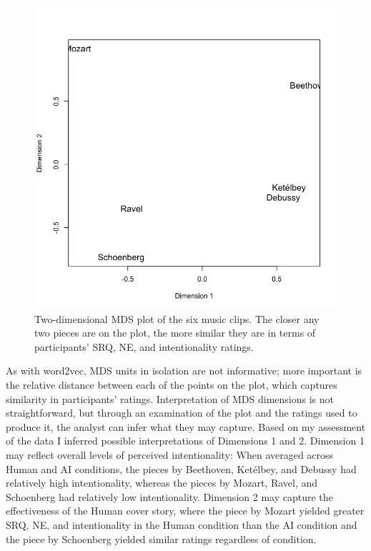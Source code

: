 \documentclass[12pt,twoside]{reedthesis}
\begin{document}
\begin{figure}[h!tbp]
	\centering
	\includegraphics[scale=0.6]{MDS.png}
	\caption{Two-dimensional MDS plot of the six music clips. The closer any two pieces are on the plot, the more similar they are in terms of participants' SRQ, NE, and intentionality ratings.}
	\label{fig-MDS}
\end{figure}

As with word2vec, MDS units in isolation are not informative; more important is the relative distance between each of the points on the plot, which captures similarity in participants' ratings. Interpretation of MDS dimensions is not straightforward, but through an examination of the plot and the ratings used to produce it, the analyst can infer what they may capture.  Based on my assessment of the data I inferred possible interpretations of Dimensions 1 and 2. Dimension 1 may reflect overall levels of perceived intentionality: When averaged across Human and AI conditions, the pieces by Beethoven, Ketélbey, and Debussy had relatively high intentionality, whereas the pieces by Mozart, Ravel, and Schoenberg had relatively low intentionality. Dimension 2 may capture the effectiveness of the Human cover story, where the piece by Mozart yielded greater SRQ, NE, and intentionality in the Human condition than the AI condition and the piece by Schoenberg yielded similar ratings regardless of condition. 
\end{document}
